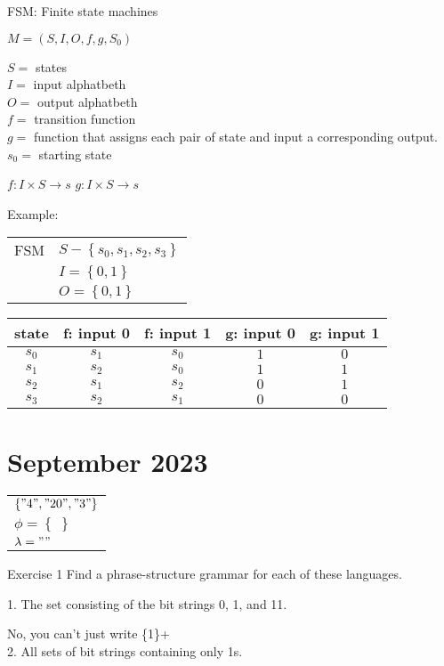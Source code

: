 \documentclass{article}
\let\stdsection\section
\renewcommand\section{\newpage\stdsection}
\begin{document}
FSM: Finite state machines

$M = \left(S, I, O, f, g , S_0\right)$

$S =$ states\\
$I =$ input alphatbeth\\
$O =$ output alphatbeth\\
$f =$ transition function\\
$g =$ function that assigns each pair of state and input a corresponding output.\\
$s_0 =$ starting state

$f: I \times S \rightarrow s$
$g: I \times S \rightarrow s$

Example:\\
\begin{tabular}{cl}
  FSM & $S - \left\{s_0, s_1, s_2, s_3\right\}$ \\
  & $I = \left\{0, 1\right\}$\\
  & $O = \left\{0, 1\right\}$
\end{tabular}

\begin{tabular}{c||c|c||c|c}
  state & f: input 0 & f: input 1 & g: input 0 & g: input 1\\ \hline
  $s_0$ & $s_1$ & $s_0$ & $1$ & $0$ \\ 
  $s_1$ & $s_2$ & $s_0$ & $1$ & $1$ \\ 
  $s_2$ & $s_1$ & $s_2$ & $0$ & $1$ \\ 
  $s_3$ & $s_2$ & $s_1$ & $0$ & $0$ \\ 
\end{tabular}

\section{ September 2023}

\begin{tabular}{l}
  $\left\{"4", "20", "3" \right\}$ \\
  $\phi = \left\{ \; \right\}$ \\
  $\lambda = "" $ \\
\end{tabular}

Exercise 1
Find a phrase-structure grammar for each of these languages.

1. The set consisting of the bit strings 0, 1, and 11.

No, you can't just write \{1\}+\\
2. All sets of bit strings containing only 1s.
\end{document}
